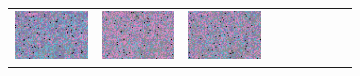 \documentclass{ipol}
\begin{document}
\begin{figure}[ht]
\begin{subfigure}[t]{\linewidth}
\begin{tabular}{ccccccccc}
                \includegraphics[width=\s]{images/carnival/DHT/bid_j95_64_grids.png}&
                \includegraphics[width=\s]{images/carnival/LINEAR/bid_j95_64_grids.png}&
                \includegraphics[width=\s]{images/carnival/PPG/bid_j95_64_grids.png}&

\end{tabular}
\end{subfigure}
\end{figure}
\end{document}

